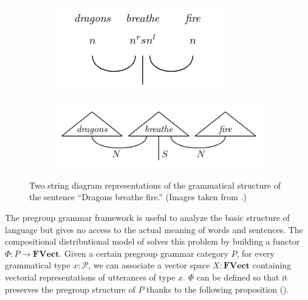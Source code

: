 \documentclass[11pt,a4paper,openright,twoside]{report}
\theoremstyle{plain}
\theoremstyle{definition}
\newcommand\dblquote[1]{\textquotedblleft #1\textquotedblright}
\begin{document}
\begin{figure}[h]
  \begin{center}
    \begin{subfigure}{0.32\textwidth}
      \includegraphics[width=\textwidth]{figures/pregroup1.png}
      \caption{}
    \end{subfigure}
    \begin{subfigure}{0.47\textwidth}
      \includegraphics[width=\textwidth]{figures/pregroup2.png}
      \caption{}
    \end{subfigure}         
    \caption[Pregroup representation of grammar]{Two string diagram representations of the grammatical structure of the sentence \dblquote{Dragons breathe fire.} (Images taken from \cite{lewis2019compositionality}.)}
    \label{fig: pregroup}
  \end{center}
\end{figure}

The pregroup grammar framework is useful to analyze the basic structure of language but gives no access to the actual meaning of words and sentences. The compositional distributional model of \cite{coecke2010mathematical} solves this problem by building a functor $\Phi: P \to  \mathbf{FVect}$. Given a certain pregroup grammar category $P$, for every grammatical type $x: \mathcal{P}$, we can associate a vector space $X:\mathbf{FVect}$ containing vectorial representations of utterances of type $x$. $\Phi$ can be defined so that it preserves the pregroup structure of $P$ thanks to the following proposition (\cite{coecke2010mathematical}).
\end{document}
